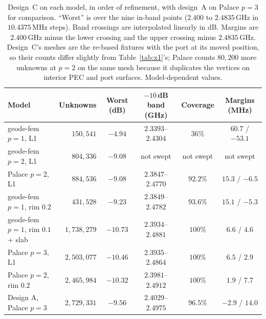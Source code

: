 \documentclass{anvil-paper}
\begin{document}
\begin{table}[t]
  \centering
  \caption{Design~C on each model, in order of refinement, with design~A on
  Palace $p = 3$ for comparison. ``Worst'' is over the nine in-band points
  ($2.400$ to $2.4835$\,GHz in $10.4375$\,MHz steps). Band crossings are
  interpolated linearly in dB. Margins are $2.400$\,GHz minus the lower
  crossing and the upper crossing minus $2.4835$\,GHz. Design~C's meshes are
  the re-based fixtures with the port at its moved position, so their counts
  differ slightly from Table~\ref{tab:x1}'s; Palace counts $80{,}200$ more
  unknowns at $p = 2$ on the same mesh because it duplicates the vertices on
  interior PEC and port surfaces. Model-dependent values.}
  \label{tab:verify}
  \small
  \setlength{\tabcolsep}{3pt}
  \begin{tabular}{@{}l r c c c c@{}}
    \toprule
    Model & Unknowns & Worst (dB) & $-10$\,dB band (GHz) & Coverage & Margins (MHz) \\
    \midrule
    geode-fem $p = 1$, L1 & $150{,}541$ & $-4.94$ & $2.3393$--$2.4304$ & $36\%$ & $60.7$ / $-53.1$ \\
    geode-fem $p = 2$, L1 & $804{,}336$ & $-9.08$ & not swept & not swept & not swept \\
    Palace $p = 2$, L1 & $884{,}536$ & $-9.08$ & $2.3847$--$2.4770$ & $92.2\%$ & $15.3$ / $-6.5$ \\
    geode-fem $p = 1$, rim $0.2$ & $431{,}528$ & $-9.23$ & $2.3849$--$2.4782$ & $93.6\%$ & $15.1$ / $-5.3$ \\
    geode-fem $p = 1$, rim $0.1$ + slab & $1{,}738{,}279$ & $-10.73$ & $2.3934$--$2.4881$ & $100\%$ & $6.6$ / $4.6$ \\
    Palace $p = 3$, L1 & $2{,}503{,}077$ & $-10.46$ & $2.3935$--$2.4864$ & $100\%$ & $6.5$ / $2.9$ \\
    Palace $p = 2$, rim $0.2$ & $2{,}465{,}984$ & $-10.32$ & $2.3981$--$2.4912$ & $100\%$ & $1.9$ / $7.7$ \\
    \midrule
    Design A, Palace $p = 3$ & $2{,}729{,}331$ & $-9.56$ & $2.4029$--$2.4975$ & $96.5\%$ & $-2.9$ / $14.0$ \\
    \bottomrule
  \end{tabular}
\end{table}
\end{document}
